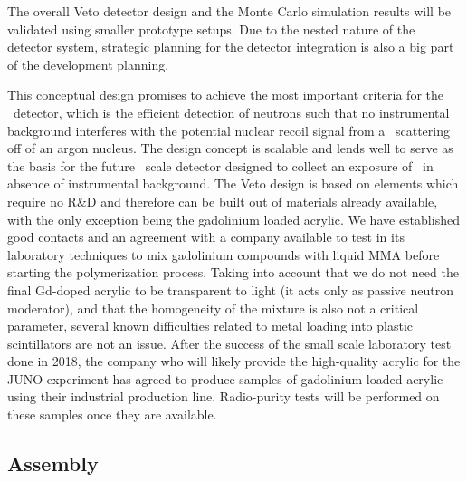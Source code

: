 The overall Veto detector design and the Monte Carlo simulation results will be validated using smaller prototype setups.  Due to the nested nature of the detector system, strategic planning for the detector integration is also a big part of the development planning.

This conceptual design promises to achieve the most important criteria for the \DSks\ detector, which is the efficient detection of neutrons such that no instrumental background interferes with the potential nuclear recoil signal from a \WIMP\ scattering off of an argon nucleus.   The design concept is scalable and lends well to serve as the basis for the future \ArgoTotalMass\ scale detector designed to collect an exposure of \ArgoExposure\ in absence of instrumental background. The Veto design is based on elements which require no R\&D and therefore can be built out of materials already available, with the only exception being the gadolinium loaded acrylic. We have established good contacts and an agreement with a company available to test in its laboratory techniques to mix gadolinium compounds with liquid MMA before starting the polymerization process. Taking into account that we do not need  the final Gd-doped acrylic to be transparent to light (it acts only as passive neutron moderator), and that the homogeneity of the mixture is also not a critical parameter, several known difficulties related to metal loading into plastic scintillators are not an issue. After the success of the small scale laboratory test done in 2018, the company who will likely provide the high-quality acrylic for the JUNO experiment has agreed to produce samples of gadolinium loaded acrylic using their industrial production line. Radio-purity tests will be performed on these samples once they are available.



\subsection{Assembly}

